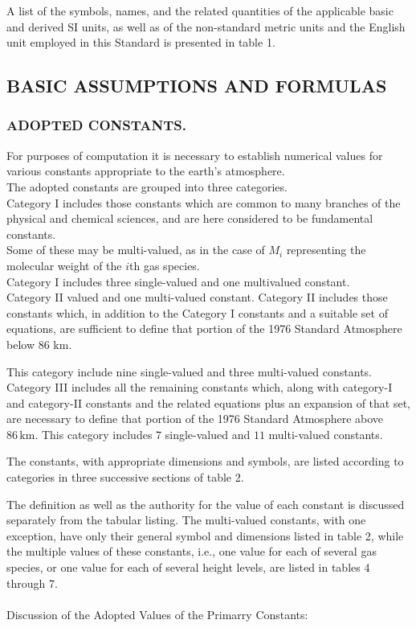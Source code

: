 \documentclass{article}
\begin{document}
A list of the symbols, names, and the related quantities of the applicable basic and derived SI units, as well as of the non-standard metric units and the English unit employed in this Standard is presented in table 1.\\

\subsection{BASIC ASSUMPTIONS AND FORMULAS}
\subsubsection{ADOPTED CONSTANTS.}

For purposes of computation it is necessary to establish numerical values for various constants appropriate to the earth's atmosphere.\\
The adopted constants are grouped into three categories.\\

Category I includes those constants which are common to many branches of the physical and chemical sciences, and are here considered to be fundamental constants.\\
Some of these may be multi-valued, as in the case of $M_i$ representing the molecular weight of the $i$th gas species.\\
Category I includes three single-valued and one multivalued constant.\\

Category II valued and one multi-valued constant. Category II includes those constants which, in addition to the Category I constants and a suitable set of equations, are sufficient to define that portion of the 1976 Standard Atmosphere below 86 km.

This category include nine single-valued and three multi-valued constants. Category III includes all the remaining constants which, along with category-I and category-II constants and the related equations plus an expansion of that set, are necessary to define that portion of the 1976 Standard Atmosphere above $86 \, \text{km}$. This category includes $7$ single-valued and $11$ multi-valued constants.

The constants, with appropriate dimensions and symbols, are listed according to categories in three successive sections of table 2.

The definition as well as the authority for the value of each constant is discussed separately from the tabular listing. The multi-valued constants, with one exception, have only their general symbol and dimensions listed in table 2, while the multiple values of these constants, i.e., one value for each of several gas species, or one value for each of several height levels, are listed in tables 4 through 7.
\\\\
Discussion of the Adopted Values of the Primarry Constants:
\\\\
\end{document}
